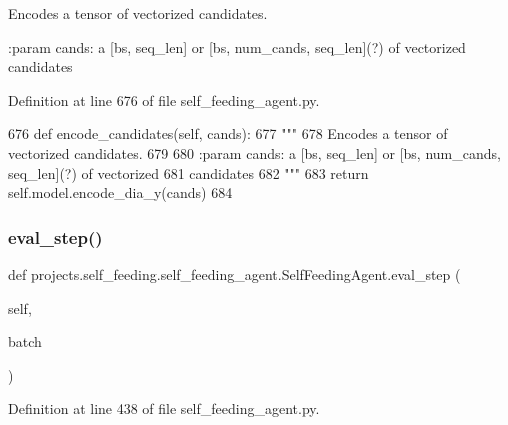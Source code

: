 \begin{DoxyVerb}Encodes a tensor of vectorized candidates.

:param cands: a [bs, seq_len] or [bs, num_cands, seq_len](?) of vectorized
    candidates
\end{DoxyVerb}
 

Definition at line 676 of file self\+\_\+feeding\+\_\+agent.\+py.


\begin{DoxyCode}
676     \textcolor{keyword}{def }encode\_candidates(self, cands):
677         \textcolor{stringliteral}{"""}
678 \textcolor{stringliteral}{        Encodes a tensor of vectorized candidates.}
679 \textcolor{stringliteral}{}
680 \textcolor{stringliteral}{        :param cands: a [bs, seq\_len] or [bs, num\_cands, seq\_len](?) of vectorized}
681 \textcolor{stringliteral}{            candidates}
682 \textcolor{stringliteral}{        """}
683         \textcolor{keywordflow}{return} self.model.encode\_dia\_y(cands)
684 
\end{DoxyCode}
\mbox{\label{classprojects_1_1self__feeding_1_1self__feeding__agent_1_1SelfFeedingAgent_af50200b087a797a01b5e5ccdd1be63ba}} 
\subsubsection{\texorpdfstring{eval\+\_\+step()}{eval\_step()}}
{\footnotesize\ttfamily def projects.\+self\+\_\+feeding.\+self\+\_\+feeding\+\_\+agent.\+Self\+Feeding\+Agent.\+eval\+\_\+step (\begin{DoxyParamCaption}\item[{}]{self,  }\item[{}]{batch }\end{DoxyParamCaption})}



Definition at line 438 of file self\+\_\+feeding\+\_\+agent.\+py.


